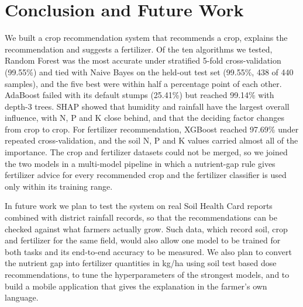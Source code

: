 \documentclass[conference]{IEEEtran}
\begin{document}
\section{Conclusion and Future Work}

We built a crop recommendation system that recommends a crop, explains the recommendation and suggests a fertilizer. Of the ten algorithms we tested, Random Forest was the most accurate under stratified 5-fold cross-validation (99.55\%) and tied with Naive Bayes on the held-out test set (99.55\%, 438 of 440 samples), and the five best were within half a percentage point of each other. AdaBoost failed with its default stumps (25.41\%) but reached 99.14\% with depth-3 trees. SHAP showed that humidity and rainfall have the largest overall influence, with N, P and K close behind, and that the deciding factor changes from crop to crop. For fertilizer recommendation, XGBoost reached 97.69\% under repeated cross-validation, and the soil N, P and K values carried almost all of the importance. The crop and fertilizer datasets could not be merged, so we joined the two models in a multi-model pipeline in which a nutrient-gap rule gives fertilizer advice for every recommended crop and the fertilizer classifier is used only within its training range.

In future work we plan to test the system on real Soil Health Card reports combined with district rainfall records, so that the recommendations can be checked against what farmers actually grow. Such data, which record soil, crop and fertilizer for the same field, would also allow one model to be trained for both tasks and its end-to-end accuracy to be measured. We also plan to convert the nutrient gap into fertilizer quantities in kg/ha using soil test based dose recommendations, to tune the hyperparameters of the strongest models, and to build a mobile application that gives the explanation in the farmer's own language.
\end{document}
